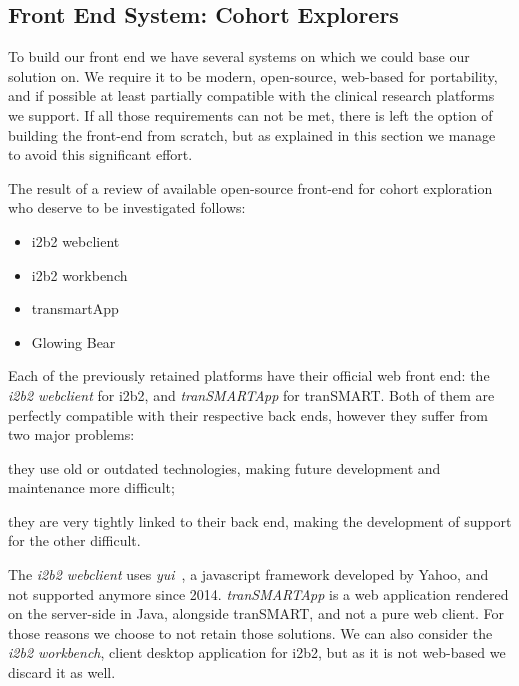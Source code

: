 \subsection{Front End System: Cohort Explorers}

To build our front end we have several systems on which we could base our solution on.
We require it to be modern, open-source, web-based for portability, and if possible at least partially compatible with the clinical research platforms we support.
If all those requirements can not be met, there is left the option of building the front-end from scratch, but as explained in this section we manage to avoid this significant effort.

The result of a review of available open-source front-end for cohort exploration who deserve to be investigated follows:
\begin{itemize}
    \item i2b2 webclient~\cite{murphy2010serving}~\cite{github:i2b2-webclient}
    \item i2b2 workbench~\cite{murphy2010serving}~\cite{github:i2b2-workbench}
    \item transmartApp~\cite{scheufele2014transmart}~\cite{github:transmartapp}
    \item Glowing Bear~\cite{gb}~\cite{github:gb}
\end{itemize}

Each of the previously retained platforms have their official web front end: the \emph{i2b2 webclient} for i2b2, and \emph{tranSMARTApp} for tranSMART.
Both of them are perfectly compatible with their respective back ends, however they suffer from two major problems:
\begin{enumerate*}
    \item they use old or outdated technologies, making future development and maintenance more difficult;
    \item they are very tightly linked to their back end, making the development of support for the other difficult.
\end{enumerate*}
The \emph{i2b2 webclient} uses \emph{yui}~\cite{yui}, a javascript framework developed by Yahoo, and not supported anymore since 2014. 
\emph{tranSMARTApp} is a web application rendered on the server-side in Java, alongside tranSMART, and not a pure web client.
For those reasons we choose to not retain those solutions.
We can also consider the \emph{i2b2 workbench}, client desktop application for i2b2, but as it is not web-based we discard it as well.

